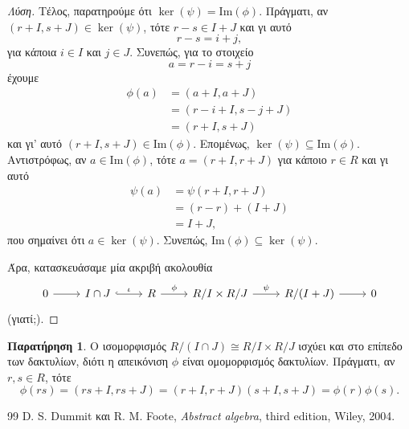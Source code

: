 \documentclass[12pt,a4paper,reqno]{amsart}
\theoremstyle{definition}
\newtheorem*{remark}{Παρατήρηση}
\newcommand{\rmIm}{\mathrm{Im}}
\begin{document}
\begin{proof}[Λύση]
    Τέλος, παρατηρούμε ότι $\ker(\psi) = \rmIm(\phi)$. Πράγματι, αν $(r+I, s+J) \in \ker(\psi)$, τότε $r-s \in I+J$ και γι αυτό 
    \[
    r-s = i + j,
    \]
    για κάποια $i \in I$ και $j \in J$. Συνεπώς, για το στοιχείο 
    \[
    a = r-i = s+j
    \]
    έχουμε  
    \begin{align*}
    \phi(a) &= 
    \left(
      a + I, a + J
    \right) \\
    &= \left(
      r-i + I, s-j + J 
    \right) \\
    &= \left(
      r+I, s+J
    \right)
    \end{align*}
    και γι' αυτό $(r+I, s+J) \in \rmIm(\phi)$. Επομένως, 
    $
    \ker(\psi) \subseteq \rmIm(\phi)
    $. 
    Αντιστρόφως, αν $a \in \rmIm(\phi)$, τότε $a = (r+I, r+J)$ για κάποιο $r \in R$ και γι αυτό 
    \begin{align*}
    \psi(a) 
    &= \psi(r+I,r+J) \\
    &= (r-r) + (I+J) \\ 
    &= I+J, 
    \end{align*}
    που σημαίνει ότι $a \in \ker(\psi)$. Συνεπώς, $\rmIm(\phi) \subseteq \ker(\psi)$.

    Άρα, κατασκευάσαμε μία ακριβή ακολουθία 
    \[
    \begin{tikzcd}
        0 \arrow[r] & I \cap J \arrow[r, hook, "\iota"] & R \arrow[r, "\phi"] & R/I \times R/J \arrow[r, "\psi"] & R/(I+J) \arrow[r] & 0
    \end{tikzcd}
    \]
    (γιατί;).
\end{proof}

\begin{remark}
  Ο ισομορφισμός $R/(I\cap{J}) \cong R/I \times R/J$ ισχύει και στο επίπεδο των δακτυλίων, διότι η απεικόνιση $\phi$ είναι ομομορφισμός δακτυλίων. Πράγματι, αν $r, s \in R$, τότε 
  \[
  \phi(rs) = \left(
    rs + I, rs + J
  \right) = \left(
    r + I, r + J
  \right)\left(
    s + I, s + J
  \right) = \phi(r)\phi(s).
  \]
\end{remark}

\begin{thebibliography}{99}
    D. S. Dummit και R. M. Foote, 
    \textit{Abstract algebra},
    third edition, Wiley, 2004. 
\end{thebibliography}
\end{document}
